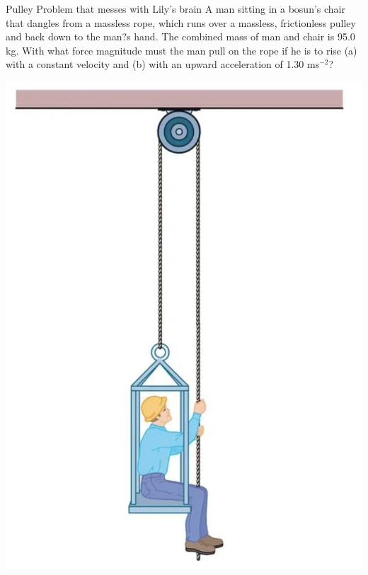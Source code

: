 \begin{frame}{Pulley Problem that messes with Lily's brain}
\scriptsize
A man sitting in a bosun's chair that dangles from a massless rope, which runs over a massless, frictionless pulley and back down to the man?s hand. The combined mass of man and chair is 95.0 kg. With what force magnitude must the man pull on the rope if he is to rise (a) with a constant velocity and (b) with an upward acceleration of 1.30 ms$^{-2}$? 



\includegraphics[scale=0.3]{bosun}
\end{frame}

